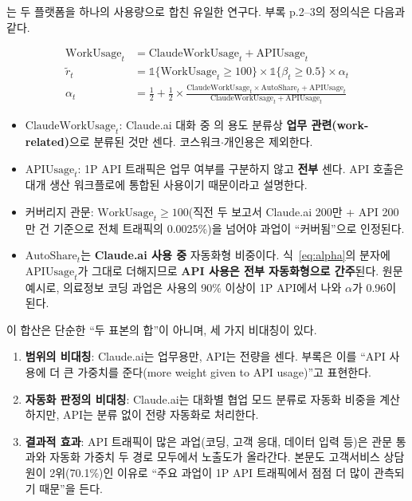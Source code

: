 \documentclass[11pt]{article}
\begin{document}
\textbf{\textcite{massenkoff-2026-labor-market-impacts-of-ai}}는 두 플랫폼을 하나의 사용량으로 합친 유일한 연구다. 부록 p.2--3의 정의식은 다음과 같다.

\begin{align}
\text{WorkUsage}_t &= \text{ClaudeWorkUsage}_t + \text{APIUsage}_t \label{eq:workusage}\\
\tilde{r}_t &= \mathbb{1}\{\text{WorkUsage}_t \ge 100\} \times \mathbb{1}\{\beta_t \ge 0.5\} \times \alpha_t \label{eq:rt}\\
\alpha_t &= \frac{1}{2} + \frac{1}{2}\times\frac{\text{ClaudeWorkUsage}_t \times \text{AutoShare}_t + \text{APIUsage}_t}{\text{ClaudeWorkUsage}_t + \text{APIUsage}_t} \label{eq:alpha}
\end{align}

\begin{itemize}
  \item $\text{ClaudeWorkUsage}_t$: Claude.ai 대화 중 \textcite{appel-2026-economic-primitives}의 용도 분류상 \textbf{업무 관련(work-related)}으로 분류된 것만 센다. 코스워크$\cdot$개인용은 제외한다.
  \item $\text{APIUsage}_t$: 1P API 트래픽은 업무 여부를 구분하지 않고 \textbf{전부} 센다. API 호출은 대개 생산 워크플로에 통합된 사용이기 때문이라고 설명한다.
  \item 커버리지 관문: $\text{WorkUsage}_t \ge 100$(직전 두 보고서 Claude.ai 200만 + API 200만 건 기준으로 전체 트래픽의 0.0025\%)을 넘어야 과업이 ``커버됨''으로 인정된다.
  \item $\text{AutoShare}_t$는 \textbf{Claude.ai 사용 중} 자동화형 비중이다. 식~\eqref{eq:alpha}의 분자에 $\text{APIUsage}_t$가 그대로 더해지므로 \textbf{API 사용은 전부 자동화형으로 간주}된다. 원문 예시로, 의료정보 코딩 과업은 사용의 90\% 이상이 1P API에서 나와 $\alpha$가 0.96이 된다.
\end{itemize}

이 합산은 단순한 ``두 표본의 합''이 아니며, 세 가지 비대칭이 있다.
\begin{enumerate}[label=(\arabic*)]
  \item \textbf{범위의 비대칭}: Claude.ai는 업무용만, API는 전량을 센다. 부록은 이를 ``API 사용에 더 큰 가중치를 준다(more weight given to API usage)''고 표현한다.
  \item \textbf{자동화 판정의 비대칭}: Claude.ai는 대화별 협업 모드 분류로 자동화 비중을 계산하지만, API는 분류 없이 전량 자동화로 처리한다.
  \item \textbf{결과적 효과}: API 트래픽이 많은 과업(코딩, 고객 응대, 데이터 입력 등)은 관문 통과와 자동화 가중치 두 경로 모두에서 노출도가 올라간다. 본문도 고객서비스 상담원이 2위(70.1\%)인 이유로 ``주요 과업이 1P API 트래픽에서 점점 더 많이 관측되기 때문''을 든다.
\end{enumerate}
\end{document}
